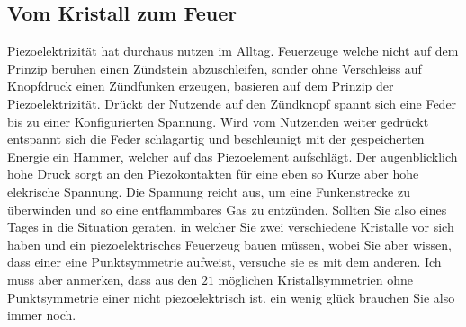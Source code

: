 \subsection{Vom Kristall zum Feuer}
Piezoelektrizität hat durchaus nutzen im Alltag.
Feuerzeuge welche nicht auf dem Prinzip beruhen einen Zündstein abzuschleifen, 
sonder ohne Verschleiss auf Knopfdruck einen Zündfunken erzeugen, basieren auf dem Prinzip der Piezoelektrizität.
Drückt der Nutzende auf den Zündknopf spannt sich eine Feder bis zu einer Konfigurierten Spannung.
Wird vom Nutzenden weiter gedrückt entspannt sich die Feder schlagartig und beschleunigt mit der gespeicherten Energie ein Hammer,
welcher auf das Piezoelement aufschlägt.
Der augenblicklich hohe Druck sorgt an den Piezokontakten für eine eben so Kurze aber hohe elekrische Spannung.
Die Spannung reicht aus, um eine Funkenstrecke zu überwinden und so eine entflammbares Gas zu entzünden.
Sollten Sie also eines Tages in die Situation geraten, in welcher Sie zwei verschiedene Kristalle vor sich haben
und ein piezoelektrisches Feuerzeug bauen müssen,
wobei Sie aber wissen, dass einer eine Punktsymmetrie aufweist,
versuche sie es mit dem anderen.
Ich muss aber anmerken, dass aus den $21$ möglichen Kristallsymmetrien ohne Punktsymmetrie einer nicht piezoelektrisch ist.
ein wenig glück brauchen Sie also immer noch.